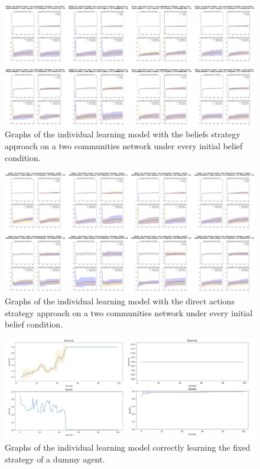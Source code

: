 \documentclass[]{llncs}
\begin{document}
\begin{figure}
\centering
\includegraphics[width=15cm]{images/individual_twocommunities1}
\caption{\label{individual_twocommunities1} Graphs of the individual learning model with the beliefs strategy approach on a two communities network under every initial belief condition.}
\end{figure}
\begin{figure}
\centering
\includegraphics[width=15cm]{images/individual_twocommunities2}
\caption{\label{individual_twocommunities2} Graphs of the individual learning model with the direct actions strategy approach on a two communities network under every initial belief condition.}
\end{figure}

\begin{figure}
\centering
\includegraphics[width=15cm]{images/individual_2agents}
\caption{\label{individual_2agents} Graphs of the individual learning model correctly learning the fixed strategy of a dummy agent.}
\end{figure}
\end{document}
